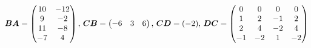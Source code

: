 {
$$\text{\boldmath{$BA$}}=\begin{pmatrix}10&-12\\9&-2\\11&-8\\-7&4\end{pmatrix},\, 
  \text{\boldmath{$CB$}}=\begin{pmatrix}-6&3&6\end{pmatrix},\, 
  \text{\boldmath{$CD$}}=(-2),\, \text{\boldmath{$DC$}} = \begin{pmatrix}0&0&0&0\\1&2&-1&2\\2&4&-2&4\\-1&-2&1&-2\end{pmatrix}$$
}
